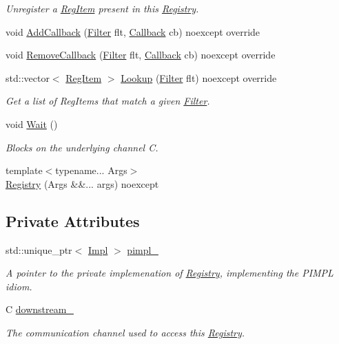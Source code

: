 \begin{DoxyCompactItemize}
\begin{DoxyCompactList}\small\item\em Unregister a \hyperlink{classregistry_1_1RegItem}{Reg\+Item} present in this \hyperlink{classregistry_1_1Registry}{Registry}. \end{DoxyCompactList}\item 
void \hyperlink{classregistry_1_1Registry_aa59df03bcaccf9a9687dbedc4e36cf33}{Add\+Callback} (\hyperlink{classregistry_1_1Filter}{Filter} flt, \hyperlink{classregistry_1_1AbstractRegistry_a08a798ca9ca1c4c983ebd2386ca3c315}{Callback} cb) noexcept override
\item 
void \hyperlink{classregistry_1_1Registry_ac3c1835aad71067924526040fccc5ce3}{Remove\+Callback} (\hyperlink{classregistry_1_1Filter}{Filter} flt, \hyperlink{classregistry_1_1AbstractRegistry_a08a798ca9ca1c4c983ebd2386ca3c315}{Callback} cb) noexcept override
\item 
std\+::vector$<$ \hyperlink{classregistry_1_1RegItem}{Reg\+Item} $>$ \hyperlink{classregistry_1_1Registry_a15423d8f77a60eb8de72b851d2d34318}{Lookup} (\hyperlink{classregistry_1_1Filter}{Filter} flt) noexcept override
\begin{DoxyCompactList}\small\item\em Get a list of Reg\+Items that match a given \hyperlink{classregistry_1_1Filter}{Filter}. \end{DoxyCompactList}\item 
void \hyperlink{classregistry_1_1Registry_a984878071c9b250148282b2b08bf999b}{Wait} ()
\begin{DoxyCompactList}\small\item\em Blocks on the underlying channel C. \end{DoxyCompactList}\item 
{\footnotesize template$<$typename... Args$>$ }\\\hyperlink{classregistry_1_1Registry_a8e577f4054494ec562dcb84f99a613b0}{Registry} (Args \&\&... args) noexcept
\end{DoxyCompactItemize}
\subsection*{Private Attributes}
\begin{DoxyCompactItemize}
\item 
std\+::unique\+\_\+ptr$<$ \hyperlink{classregistry_1_1Registry_1_1Impl}{Impl} $>$ \hyperlink{classregistry_1_1Registry_a027d968f8cf69061ba3a3ed5e0801874}{pimpl\+\_\+}
\begin{DoxyCompactList}\small\item\em A pointer to the private implemenation of \hyperlink{classregistry_1_1Registry}{Registry}, implementing the P\+I\+M\+PL idiom. \end{DoxyCompactList}\item 
C \hyperlink{classregistry_1_1Registry_a12c8c9619c8f4ad1fba66b58b4da0dca}{downstream\+\_\+}
\begin{DoxyCompactList}\small\item\em The communication channel used to access this \hyperlink{classregistry_1_1Registry}{Registry}. \end{DoxyCompactList}\end{DoxyCompactItemize}
